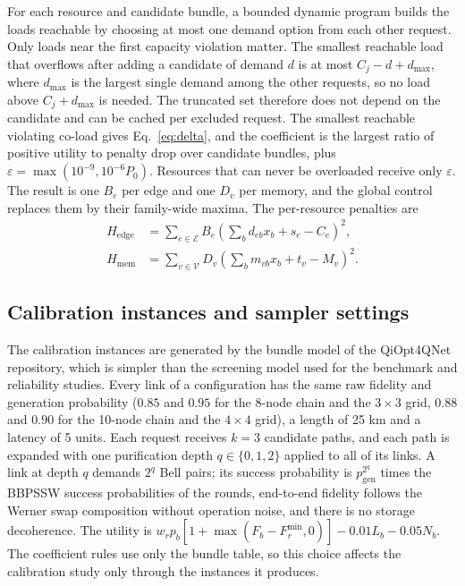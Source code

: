 \documentclass[pdflatex,sn-nature]{sn-jnl}
\newcommand{\Eset}{\mathcal{E}}
\newcommand{\Vset}{\mathcal{V}}
\newcommand{\eps}{\varepsilon}
\theoremstyle{plain}
\theoremstyle{remark}
\begin{document}
For each resource and candidate bundle, a bounded dynamic program builds the loads reachable by choosing at most one demand option from each other request. Only loads near the first capacity violation matter. The smallest reachable load that overflows after adding a candidate of demand $d$ is at most $C_j-d+d_{\max}$, where $d_{\max}$ is the largest single demand among the other requests, so no load above $C_j+d_{\max}$ is needed. The truncated set therefore does not depend on the candidate and can be cached per excluded request. The smallest reachable violating co-load gives Eq.~\ref{eq:delta}, and the coefficient is the largest ratio of positive utility to penalty drop over candidate bundles, plus $\eps=\max(10^{-9},10^{-6}P_0)$. Resources that can never be overloaded receive only $\eps$. The result is one $B_e$ per edge and one $D_v$ per memory, and the global control replaces them by their family-wide maxima. The per-resource penalties are
\begin{align}
H_{\mathrm{edge}}&=\sum_{e\in\Eset}B_e\left(\sum_bd_{eb}x_b+s_e-C_e\right)^2,\\
H_{\mathrm{mem}}&=\sum_{v\in\Vset}D_v\left(\sum_bm_{vb}x_b+t_v-M_v\right)^2.
\end{align}

\subsection{Calibration instances and sampler settings}

The calibration instances are generated by the bundle model of the QiOpt4QNet repository, which is simpler than the screening model used for the benchmark and reliability studies. Every link of a configuration has the same raw fidelity and generation probability ($0.85$ and $0.95$ for the 8-node chain and the $3\times3$ grid, $0.88$ and $0.90$ for the 10-node chain and the $4\times4$ grid), a length of 25 km and a latency of 5 units. Each request receives $k=3$ candidate paths, and each path is expanded with one purification depth $q\in\{0,1,2\}$ applied to all of its links. A link at depth $q$ demands $2^q$ Bell pairs; its success probability is $p_{\mathrm{gen}}^{2^q}$ times the BBPSSW success probabilities of the rounds, end-to-end fidelity follows the Werner swap composition without operation noise, and there is no storage decoherence. The utility is $w_rp_b[1+\max(F_b-F_r^{\min},0)]-0.01L_b-0.05N_b$. The coefficient rules use only the bundle table, so this choice affects the calibration study only through the instances it produces.
\end{document}
